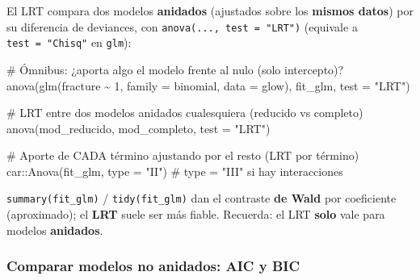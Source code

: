 \documentclass[
  letterpaper,
  DIV=11,
  numbers=noendperiod]{scrartcl}
\newenvironment{Shaded}{\begin{snugshade}}{\end{snugshade}}
\newcommand{\AttributeTok}[1]{\textcolor[rgb]{0.40,0.45,0.13}{#1}}
\newcommand{\CommentTok}[1]{\textcolor[rgb]{0.37,0.37,0.37}{#1}}
\newcommand{\DecValTok}[1]{\textcolor[rgb]{0.68,0.00,0.00}{#1}}
\newcommand{\FunctionTok}[1]{\textcolor[rgb]{0.28,0.35,0.67}{#1}}
\newcommand{\NormalTok}[1]{\textcolor[rgb]{0.00,0.23,0.31}{#1}}
\newcommand{\SpecialCharTok}[1]{\textcolor[rgb]{0.37,0.37,0.37}{#1}}
\newcommand{\StringTok}[1]{\textcolor[rgb]{0.13,0.47,0.30}{#1}}
\begin{document}
\begin{tcolorbox}[enhanced jigsaw, breakable, colframe=quarto-callout-tip-color-frame, left=2mm, arc=.35mm, colbacktitle=quarto-callout-tip-color!10!white, toprule=.15mm, colback=white, coltitle=black, rightrule=.15mm, opacitybacktitle=0.6, title=\textcolor{quarto-callout-tip-color}{\faLightbulb}\hspace{0.5em}{🔧 En R. Contrastes de razón de verosimilitudes (LRT)}, titlerule=0mm, toptitle=1mm, bottomtitle=1mm, leftrule=.75mm, bottomrule=.15mm, opacityback=0]

El LRT compara dos modelos \textbf{anidados} (ajustados sobre los
\textbf{mismos datos}) por su diferencia de deviances, con
\texttt{anova(...,\ test\ =\ "LRT")} (equivale a
\texttt{test\ =\ "Chisq"} en \texttt{glm}):

\begin{Shaded}
\begin{Highlighting}[]
\CommentTok{\# Ómnibus: ¿aporta algo el modelo frente al nulo (solo intercepto)?}
\FunctionTok{anova}\NormalTok{(}\FunctionTok{glm}\NormalTok{(fracture }\SpecialCharTok{\textasciitilde{}} \DecValTok{1}\NormalTok{, }\AttributeTok{family =}\NormalTok{ binomial, }\AttributeTok{data =}\NormalTok{ glow), fit\_glm, }\AttributeTok{test =} \StringTok{"LRT"}\NormalTok{)}

\CommentTok{\# LRT entre dos modelos anidados cualesquiera (reducido vs completo)}
\FunctionTok{anova}\NormalTok{(mod\_reducido, mod\_completo, }\AttributeTok{test =} \StringTok{"LRT"}\NormalTok{)}

\CommentTok{\# Aporte de CADA término ajustando por el resto (LRT por término)}
\NormalTok{car}\SpecialCharTok{::}\FunctionTok{Anova}\NormalTok{(fit\_glm, }\AttributeTok{type =} \StringTok{"II"}\NormalTok{)     }\CommentTok{\# type = "III" si hay interacciones}
\end{Highlighting}
\end{Shaded}

\texttt{summary(fit\_glm)} / \texttt{tidy(fit\_glm)} dan el contraste
\textbf{de Wald} por coeficiente (aproximado); el \textbf{LRT} suele ser
más fiable. Recuerda: el LRT \textbf{solo} vale para modelos
\textbf{anidados}.

\end{tcolorbox}

\hypertarget{comparar-modelos-no-anidados-aic-y-bic}{%
\subsubsection{Comparar modelos no anidados: AIC y
BIC}\label{comparar-modelos-no-anidados-aic-y-bic}}
\end{document}
